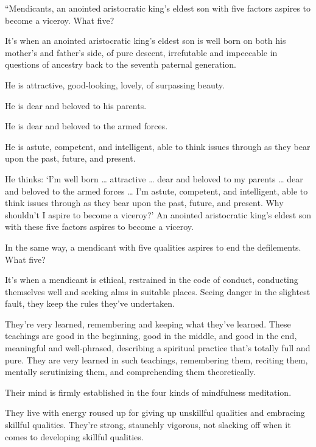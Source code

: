\documentclass[12pt,openany]{book}%
\begin{document}
“Mendicants, an anointed aristocratic king’s eldest son with five factors aspires to become a viceroy. What five? 

It’s when an anointed aristocratic king’s eldest son is well born on both his mother’s and father’s side, of pure descent, irrefutable and impeccable in questions of ancestry back to the seventh paternal generation. 

He is attractive, good-looking, lovely, of surpassing beauty. 

He is dear and beloved to his parents. 

He is dear and beloved to the armed forces. 

He is astute, competent, and intelligent, able to think issues through as they bear upon the past, future, and present. 

He thinks: ‘I’m well born … attractive … dear and beloved to my parents … dear and beloved to the armed forces … I’m astute, competent, and intelligent, able to think issues through as they bear upon the past, future, and present. Why shouldn’t I aspire to become a viceroy?’ An anointed aristocratic king’s eldest son with these five factors aspires to become a viceroy. 

In the same way, a mendicant with five qualities aspires to end the defilements. What five? 

It’s when a mendicant is ethical, restrained in the code of conduct, conducting themselves well and seeking alms in suitable places. Seeing danger in the slightest fault, they keep the rules they’ve undertaken. 

They’re very learned, remembering and keeping what they’ve learned. These teachings are good in the beginning, good in the middle, and good in the end, meaningful and well-phrased, describing a spiritual practice that’s totally full and pure. They are very learned in such teachings, remembering them, reciting them, mentally scrutinizing them, and comprehending them theoretically. 

Their mind is firmly established in the four kinds of mindfulness meditation. 

They live with energy roused up for giving up unskillful qualities and embracing skillful qualities. They’re strong, staunchly vigorous, not slacking off when it comes to developing skillful qualities. 
\end{document}
